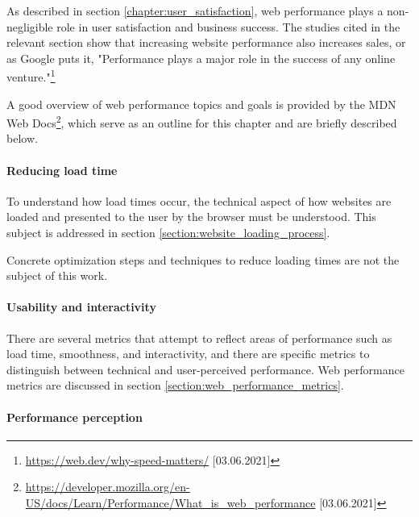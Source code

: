 
As described in section \ref{chapter:user_satisfaction}, web performance plays a non-negligible role in user satisfaction and business success.
The studies cited in the relevant section show that increasing website performance also increases sales, or as Google puts it, "Performance plays a major role in the success of any online venture."\footnote{\url{https://web.dev/why-speed-matters/} [03.06.2021]}

A good overview of web performance topics and goals is provided by the MDN Web Docs\footnote{\url{https://developer.mozilla.org/en-US/docs/Learn/Performance/What_is_web_performance} [03.06.2021]}, which serve as an outline for this chapter and are briefly described below.


\paragraph{Reducing load time}

To understand how load times occur, the technical aspect of how websites are loaded and presented to the user by the browser must be understood.
This subject is addressed in section \ref{section:website_loading_process}.

Concrete optimization steps and techniques to reduce loading times are not the subject of this work.


\paragraph{Usability and interactivity}

There are several metrics that attempt to reflect areas of performance such as load time, smoothness, and interactivity, and there are specific metrics to distinguish between technical and user-perceived performance.
Web performance metrics are discussed in section \ref{section:web_performance_metrics}.


\paragraph{Performance perception}

